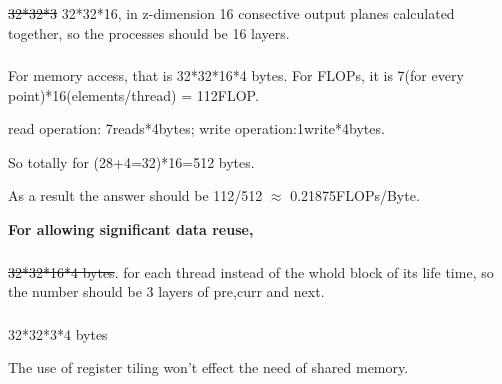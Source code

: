 \documentclass{article}
\begin{document}
\subsubsection{}
\sout{32*32*3} 32*32*16, in z-dimension 16 consective output planes calculated together, so the processes should be 16 layers.

\subsubsection{}
For memory access, that is 32*32*16*4 bytes. For FLOPs, it is 7(for every point)*16(elements/thread) = 112FLOP.

read operation: 7reads*4bytes; write operation:1write*4bytes.

So totally for (28+4=32)*16=512 bytes.

As a result the answer should be 112/512 $\approx$ 0.21875FLOPs/Byte.

\textbf{For allowing  significant data reuse,}

\subsubsection{}
\sout{32*32*16*4 bytes}. for each thread instead of the whold block of its life time, so the number should be 3 layers of pre,curr and next.

\subsubsection{}
32*32*3*4 bytes

The use of register tiling won't effect the need of shared memory.
\end{document}
